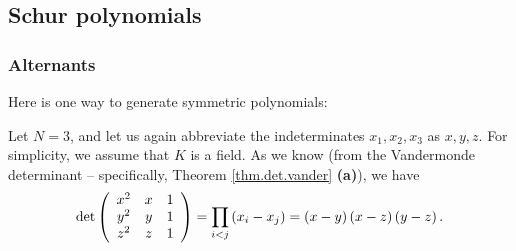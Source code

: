\subsection{\label{sec.sf.schur}Schur polynomials}

\subsubsection{Alternants}

Here is one way to generate symmetric polynomials:

\begin{example}
Let $N=3$, and let us again abbreviate the indeterminates $x_{1},x_{2},x_{3}$
as $x,y,z$. For simplicity, we assume that $K$ is a field. As we know (from
the Vandermonde determinant -- specifically, Theorem \ref{thm.det.vander}
\textbf{(a)}), we have%
\[
\det\left(
\begin{array}
[c]{ccc}%
x^{2} & x & 1\\
y^{2} & y & 1\\
z^{2} & z & 1
\end{array}
\right)  =\prod_{i<j}\left(  x_{i}-x_{j}\right)  =\left(  x-y\right)  \left(
x-z\right)  \left(  y-z\right)  .
\]



\end{example}
